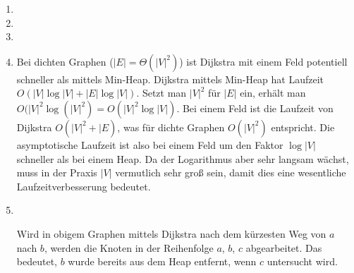 \documentclass[11pt,a4paper]{article}
\begin{document}
\begin{loesung}
    \begin{enumerate}
        \item 
        \item
        \item
        \item
        Bei dichten Graphen ($|E| = \Theta(|V|^2)$) ist Dijkstra mit einem Feld potentiell schneller als mittels Min-Heap.
        Dijkstra mittels Min-Heap hat Laufzeit $O(|V| \log |V| + |E| \log |V|)$.
        Setzt man $|V|^2$ für $|E|$ ein, erhält man $O(|V|^2 \log\left(|V|^2\right) = O(|V|^2 \log |V|)$.
        Bei einem Feld ist die Laufzeit von Dijkstra $O(|V|^2 + |E)$, was für dichte Graphen $O(|V|^2)$ entspricht.
        Die asymptotische Laufzeit ist also bei einem Feld um den Faktor $\log |V|$ schneller als bei einem Heap.
        Da der Logarithmus aber sehr langsam wächst, muss in der Praxis $|V|$ vermutlich sehr groß sein, damit dies eine wesentliche Laufzeitverbesserung bedeutet.
        \item \ \\
        \begin{figure}[h!]
            \centering
        \end{figure}
        \FloatBarrier
        Wird in obigem Graphen mittels Dijkstra nach dem kürzesten Weg von $a$ nach $b$, werden die Knoten in der Reihenfolge $a$, $b$, $c$ abgearbeitet.
        Das bedeutet, $b$ wurde bereits aus dem Heap entfernt, wenn $c$ untersucht wird.

\end{enumerate}
\end{loesung}
\end{document}
